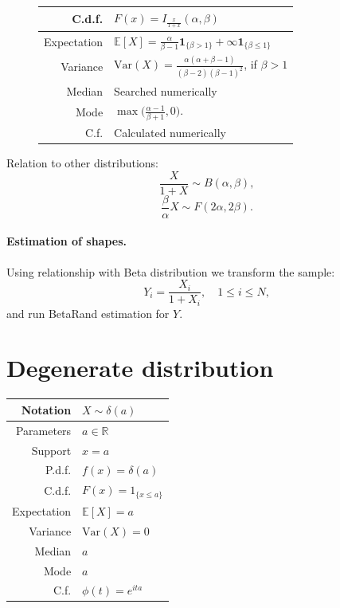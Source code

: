 \documentclass[a4paper,11pt]{article}
\theoremstyle{plain}
\theoremstyle{definition}
\newcommand{\ME}{\mathbb{E}}
\newcommand{\MR}{\mathbb{R}}
\newcommand{\Var}{\mathrm{Var}}
\begin{document}
\begin{figure}[!htb]
\begin{minipage}{0.4\textwidth}
\begin{tabular}{| r | l |}
				\hline
				C.d.f. & $F(x)=I_{\frac{x}{1+x}}(\alpha, \beta)$\\
				\hline
				Expectation & $\ME[X] = \frac{\alpha}{\beta - 1}\mathbf{1}_{\{\beta > 1 \} } + \infty \mathbf{1}_{\{\beta \leq 1\} } $ \\
				\hline
				Variance & $\Var(X) =\frac{ \alpha (\alpha +\beta - 1) }{ (\beta-2)(\beta-1)^2 }$, if $\beta > 1$ \\
				\hline
				Median & Searched numerically \\
				\hline
				Mode & $\max\big( \frac{\alpha-1}{\beta+1}, 0 \big)$. \\
				\hline
				C.f. & Calculated numerically \\
				\hline
			\end{tabular}
		\end{minipage}
	\end{figure}
	Relation to other distributions:
	\[\frac{X}{1+X} \sim B(\alpha, \beta),\]
	\[
	\frac{\beta}{\alpha}X \sim F(2\alpha, 2\beta ).
	\]
	\paragraph{Estimation of shapes.} Using relationship with Beta distribution we transform the sample:
	\[ Y_i = \frac{X_i}{1+X_i}, \quad 1 \leq i \leq N, \]
	and run BetaRand estimation for $Y$.
	\section{Degenerate distribution}
	\begin{center}
		\begin{tabular}{| r | l |}
			\hline
			Notation & $X \sim \delta(a)$ \\
			\hline
			Parameters & $a \in \MR$ \\
			\hline
			Support & $x = a$  \\
			\hline
			P.d.f. & $f(x) = \delta(a)$ \\
			\hline
			C.d.f. & $F(x)=1_{\{x \leq a\}} $\\
			\hline
			Expectation & $\ME[X] = a$ \\
			\hline
			Variance & $\Var(X) = 0$ \\
			\hline
			Median & $a$ \\
			\hline
			Mode & $a$ \\
			\hline
			C.f. & $\phi(t) = e^{ita}$ \\
			\hline
		\end{tabular}
	\end{center}
	
\end{document}
